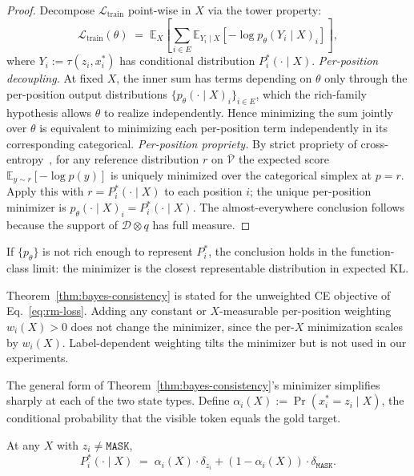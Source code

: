\documentclass{llmxive}
\providecommand{\xstar}{x^{\ast}}
\providecommand{\mask}{\texttt{MASK}}
\providecommand{\Ltrain}{\mathcal{L}_{\mathrm{train}}}
\begin{document}
\begin{proof}
Decompose $\Ltrain$ point-wise in $X$ via the tower property:
\[
\Ltrain(\theta) \;=\; \mathbb{E}_X\!\left[\sum_{i \in E} \mathbb{E}_{Y_i \mid X}\!\left[-\log p_\theta(Y_i \mid X)_i\right]\right],
\]
where $Y_i := \tau(z_i, \xstar_i)$ has conditional distribution $P^*_i(\cdot \mid X)$. \emph{Per-position decoupling.} At fixed $X$, the inner sum has terms depending on $\theta$ only through the per-position output distributions $\{p_\theta(\cdot \mid X)_i\}_{i \in E}$, which the rich-family hypothesis allows $\theta$ to realize independently. Hence minimizing the sum jointly over $\theta$ is equivalent to minimizing each per-position term independently in its corresponding categorical. \emph{Per-position propriety.} By strict propriety of cross-entropy~\cite{gneiting2007strictly}, for any reference distribution $r$ on $\bar{\mathcal{V}}$ the expected score $\mathbb{E}_{y \sim r}[-\log p(y)]$ is uniquely minimized over the categorical simplex at $p = r$. Apply this with $r = P^*_i(\cdot \mid X)$ to each position $i$; the unique per-position minimizer is $p_\theta(\cdot \mid X)_i = P^*_i(\cdot \mid X)$. The almost-everywhere conclusion follows because the support of $\mathcal{D} \otimes q$ has full measure.
\end{proof}

\begin{remark}
If $\{p_\theta\}$ is not rich enough to represent $P^*_i$, the conclusion holds in the function-class limit: the minimizer is the closest representable distribution in expected KL.
\end{remark}

\begin{remark}
Theorem~\ref{thm:bayes-consistency} is stated for the unweighted CE objective of Eq.~\eqref{eq:rm-loss}. Adding any constant or $X$-measurable per-position weighting $w_i(X) > 0$ does not change the minimizer, since the per-$X$ minimization scales by $w_i(X)$. Label-dependent weighting tilts the minimizer but is not used in our experiments.
\end{remark}

The general form of Theorem~\ref{thm:bayes-consistency}'s minimizer simplifies sharply at each of the two state types. Define $\alpha_i(X) := \Pr(\xstar_i = z_i \mid X)$, the conditional probability that the visible token equals the gold target.

\begin{proposition}
\label{prop:visible-belief}
At any $X$ with $z_i \neq \mask$,
\[
P^*_i(\cdot \mid X) \;=\; \alpha_i(X) \cdot \delta_{z_i} + (1 - \alpha_i(X)) \cdot \delta_{\mask}.
\]
\end{proposition}
\end{document}
